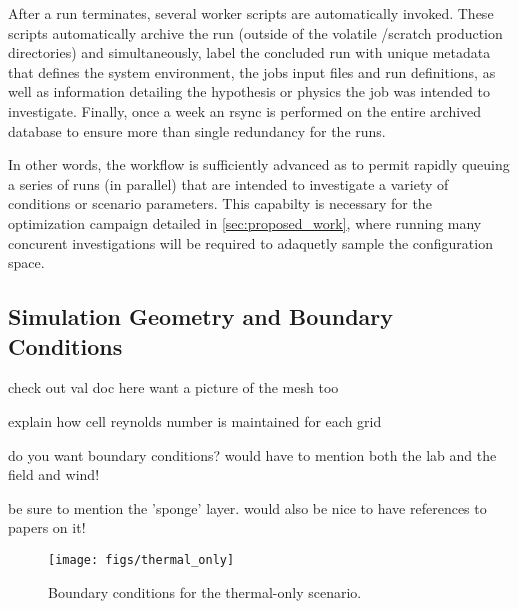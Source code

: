 After a run terminates, several worker scripts are automatically invoked. 
These scripts automatically archive the run (outside of the volatile /scratch 
production directories) and simultaneously, label the concluded run with unique metadata
that defines the system environment, the jobs input files and run definitions, as well as 
information detailing the hypothesis or physics the job was intended to investigate.
Finally, once a week an rsync is performed on the entire archived database to ensure 
more than single redundancy for the runs.

In other words, the workflow is sufficiently advanced as to permit rapidly queuing 
a series of runs (in parallel) that are intended to investigate a variety of conditions or 
scenario parameters. This capabilty is necessary for the optimization campaign detailed 
in \ref{sec:proposed_work}, where running many concurent investigations will be required to
adaquetly sample the configuration space. 

\subsection{Simulation Geometry and Boundary Conditions}

check out val doc here
want a picture of the mesh too

explain how cell reynolds number is maintained for each grid

do you want boundary conditions? would have to mention both the lab and
the field and wind!

be sure to mention the 'sponge' layer. would also be nice to have references to papers on it!

\begin{figure}[!htb]
  \begin{center}
    \texttt{[image: figs/thermal\_only]}
    \caption{Boundary conditions for the thermal-only scenario. }
    \label{fig:thermalbc}
  \end{center}
\end{figure}
